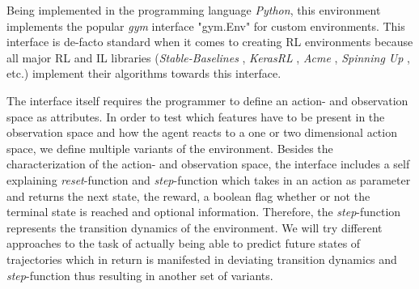 Being implemented in the programming language \textit{Python}, this environment implements the popular \textit{gym} interface "gym.Env" \cite[]{gym} for custom environments. This interface is de-facto standard when it comes to creating RL environments because all major RL and IL libraries (\textit{Stable-Baselines} \cite[]{stable-baselines3}, \textit{KerasRL} \cite[]{plappert2016kerasrl}, \textit{Acme} \cite[]{hoffman2020acme}, \textit{Spinning Up} \cite[]{SpinningUp2018}, etc.) implement their algorithms towards this interface.
\par
The interface itself requires the programmer to define an action- and observation space as attributes. In order to test which features have to be present in the observation space and how the agent reacts to a one or two dimensional action space, we define multiple variants of the environment. Besides the characterization of the action- and observation space, the interface includes a self explaining \textit{reset}-function and \textit{step}-function which takes in an action as parameter and returns the next state, the reward, a boolean flag whether or not the terminal state is reached and optional information. Therefore, the \textit{step}-function represents the transition dynamics of the environment. We will try different approaches to the task of actually being able to predict future states of trajectories which in return is manifested in deviating transition dynamics and \textit{step}-function thus resulting in another set of variants.

